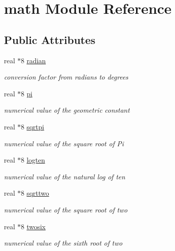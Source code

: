 \hypertarget{classmath}{\section{math Module Reference}
\label{classmath}
}
\subsection*{Public Attributes}
\begin{DoxyCompactItemize}
\item 
real $\ast$8 \hyperlink{classmath_a9d21837b0d1dba1f56f6b55213417e1e}{radian}
\begin{DoxyCompactList}\small\item\em conversion factor from radians to degrees \end{DoxyCompactList}\item 
real $\ast$8 \hyperlink{classmath_a150fc8a877628e302d3a2c349b1d38e1}{pi}
\begin{DoxyCompactList}\small\item\em numerical value of the geometric constant \end{DoxyCompactList}\item 
real $\ast$8 \hyperlink{classmath_acde39e7f34ffe785d3b7b1c6e7609a7c}{sqrtpi}
\begin{DoxyCompactList}\small\item\em numerical value of the square root of Pi \end{DoxyCompactList}\item 
real $\ast$8 \hyperlink{classmath_a8691ad8a010a0a20ca259a70ea8bf242}{logten}
\begin{DoxyCompactList}\small\item\em numerical value of the natural log of ten \end{DoxyCompactList}\item 
real $\ast$8 \hyperlink{classmath_a7903363fd9938fb372dc41cb85238481}{sqrttwo}
\begin{DoxyCompactList}\small\item\em numerical value of the square root of two \end{DoxyCompactList}\item 
real $\ast$8 \hyperlink{classmath_a46e872c6d0df3ae0a736e5e25225ab71}{twosix}
\begin{DoxyCompactList}\small\item\em numerical value of the sixth root of two \end{DoxyCompactList}\end{DoxyCompactItemize}


